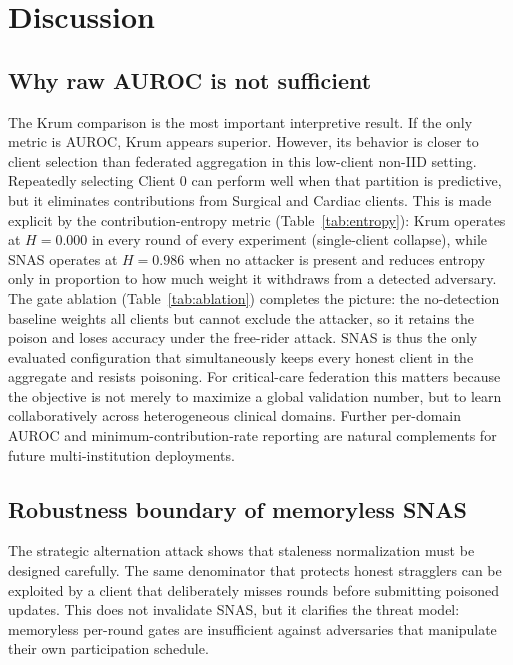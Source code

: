 \documentclass[pdflatex,sn-mathphys-num]{sn-jnl}
\begin{document}
\section{Discussion}\label{sec:discussion}

\subsection{Why raw AUROC is not sufficient}

The Krum comparison is the most important interpretive result. If the only metric is AUROC, Krum appears superior. However, its behavior is closer to client selection than federated aggregation in this low-client non-IID setting. Repeatedly selecting Client 0 can perform well when that partition is predictive, but it eliminates contributions from Surgical and Cardiac clients. This is made explicit by the contribution-entropy metric (Table~\ref{tab:entropy}): Krum operates at $H=0.000$ in every round of every experiment (single-client collapse), while SNAS operates at $H=0.986$ when no attacker is present and reduces entropy only in proportion to how much weight it withdraws from a detected adversary. The gate ablation (Table~\ref{tab:ablation}) completes the picture: the no-detection baseline weights all clients but cannot exclude the attacker, so it retains the poison and loses accuracy under the free-rider attack. SNAS is thus the only evaluated configuration that simultaneously keeps every honest client in the aggregate and resists poisoning. For critical-care federation this matters because the objective is not merely to maximize a global validation number, but to learn collaboratively across heterogeneous clinical domains. Further per-domain AUROC and minimum-contribution-rate reporting are natural complements for future multi-institution deployments.

\subsection{Robustness boundary of memoryless SNAS}

The strategic alternation attack shows that staleness normalization must be designed carefully. The same denominator that protects honest stragglers can be exploited by a client that deliberately misses rounds before submitting poisoned updates. This does not invalidate SNAS, but it clarifies the threat model: memoryless per-round gates are insufficient against adversaries that manipulate their own participation schedule.
\end{document}
